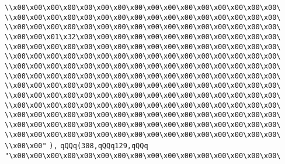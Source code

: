 \verb|\\x00\x00\x00\x00\x00\x00\x00\x00\x00\x00\x00\x00\x00\x00\x00\x00\|\newline
\verb|\\x00\x00\x00\x00\x00\x00\x00\x00\x00\x00\x00\x00\x00\x00\x00\x00\|\newline
\verb|\\x00\x00\x00\x00\x00\x00\x00\x00\x00\x00\x00\x00\x00\x00\x00\x00\|\newline
\verb|\\x00\x00\x01\x32\x00\x00\x00\x00\x00\x00\x00\x00\x00\x00\x00\x00\|\newline
\verb|\\x00\x00\x00\x00\x00\x00\x00\x00\x00\x00\x00\x00\x00\x00\x00\x00\|\newline
\verb|\\x00\x00\x00\x00\x00\x00\x00\x00\x00\x00\x00\x00\x00\x00\x00\x00\|\newline
\verb|\\x00\x00\x00\x00\x00\x00\x00\x00\x00\x00\x00\x00\x00\x00\x00\x00\|\newline
\verb|\\x00\x00\x00\x00\x00\x00\x00\x00\x00\x00\x00\x00\x00\x00\x00\x00\|\newline
\verb|\\x00\x00\x00\x00\x00\x00\x00\x00\x00\x00\x00\x00\x00\x00\x00\x00\|\newline
\verb|\\x00\x00\x00\x00\x00\x00\x00\x00\x00\x00\x00\x00\x00\x00\x00\x00\|\newline
\verb|\\x00\x00\x00\x00\x00\x00\x00\x00\x00\x00\x00\x00\x00\x00\x00\x00\|\newline
\verb|\\x00\x00\x00\x00\x00\x00\x00\x00\x00\x00\x00\x00\x00\x00\x00\x00\|\newline
\verb|\\x00\x00\x00\x00\x00\x00\x00\x00\x00\x00\x00\x00\x00\x00\x00\x00\|\newline
\verb|\\x00\x00\x00\x00\x00\x00\x00\x00\x00\x00\x00\x00\x00\x00\x00\x00\|\newline
\verb|\\x00\x00"|\newline
\verb|),|\newline
\verb|qQQq(308,qQQq129,qQQq|\newline
\verb|"\x00\x00\x00\x00\x00\x00\x00\x00\x00\x00\x00\x00\x00\x00\x00\x00\|\newline
